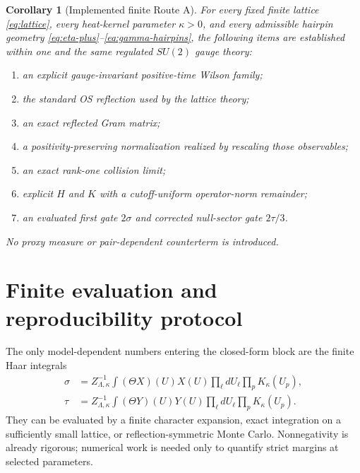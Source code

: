 \documentclass[11pt]{article}
\newtheorem{corollary}[theorem]{Corollary}
\begin{document}
\begin{corollary}[Implemented finite Route A]
\label{cor:implemented-route-a}
For every fixed finite lattice \eqref{eq:lattice}, every heat-kernel parameter $\kappa>0$, and every admissible hairpin geometry \eqref{eq:eta-plus}--\eqref{eq:gamma-hairpins}, the following items are established within one and the same regulated $SU(2)$ gauge theory:
\begin{enumerate}[label=(\roman*)]
  \item an explicit gauge-invariant positive-time Wilson family;
  \item the standard OS reflection used by the lattice theory;
  \item an exact reflected Gram matrix;
  \item a positivity-preserving normalization realized by rescaling those observables;
  \item an exact rank-one collision limit;
  \item explicit $H$ and $K$ with a cutoff-uniform operator-norm remainder;
  \item an evaluated first gate $2\sigma$ and corrected null-sector gate $2\tau/3$.
\end{enumerate}
No proxy measure or pair-dependent counterterm is introduced.
\end{corollary}

\section{Finite evaluation and reproducibility protocol}
\label{sec:protocol}

The only model-dependent numbers entering the closed-form block are the finite Haar integrals
\begin{align}
  \sigma
  &=Z_{\Lambda,\kappa}^{-1}
  \int (\Theta X)(U)X(U)
  \prod_{\ell}dU_\ell
  \prod_pK_\kappa(U_p),
  \label{eq:sigma-integral}\\
  \tau
  &=Z_{\Lambda,\kappa}^{-1}
  \int (\Theta Y)(U)Y(U)
  \prod_{\ell}dU_\ell
  \prod_pK_\kappa(U_p).
  \label{eq:tau-integral}
\end{align}
They can be evaluated by a finite character expansion, exact integration on a sufficiently small lattice, or reflection-symmetric Monte Carlo.  Nonnegativity is already rigorous; numerical work is needed only to quantify strict margins at selected parameters.
\end{document}
